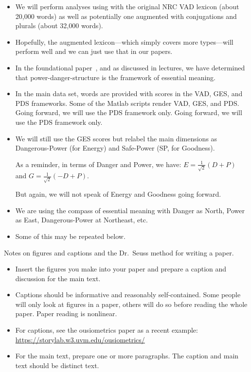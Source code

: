 \begin{itemize}
\item 
  We will perform analyses using with the original NRC VAD lexicon (about 20,000 words)
  as well as potentially one augmented with conjugations and plurals (about 32,000 words).
\item 
  Hopefully, the augmented lexicon---which simply covers more types---will perform well
  and we can just use that in our papers.
\item 
  In the foundational paper~\cite{dodds2021b},
  and as discussed in lectures,
  we have determined that power-danger-structure is the framework of essential meaning.
\item 
  In the main data set, words are provided with scores
  in the VAD, GES, and PDS frameworks. Some of the Matlab scripts
  render VAD, GES, and PDS.
  Going forward, we will use the PDS framework only.
  Going forward, we will use the PDS framework only.
\item
  We will still use the GES scores but relabel the main dimensions as
  Dangerous-Power (for Energy) and Safe-Power (SP, for Goodness).

  As a reminder, in terms of Danger and Power, we have:
  $
  E
  =
  \frac{1}{\sqrt{2}}
  \left(
  D + P
  \right)
  $
  and
  $
  G
  =
  \frac{1}{\sqrt{2}}
  \left(
  - D + P
  \right).
  $

  But again, we will not speak of Energy and Goodness going forward.
\item
  We are using the compass of essential meaning with Danger as North, Power as East,
  Dangerous-Power at Northeast, etc.
\item
  Some of this may be repeated below.
\end{itemize}

Notes on figures and captions and the Dr.\ Seuss method for writing a paper.
\begin{itemize}
\item 
  Insert the figures you make into your paper and prepare a caption
  and discussion for the main text.
\item 
  Captions should be informative and reasonably self-contained.
  Some people will only look at figures in a paper, others will do
  so before reading the whole paper. Paper reading is nonlinear.
\item 
  For captions, see the ousiometrics paper as a recent example:\\
  \url{https://storylab.w3.uvm.edu/ousiometrics/}
\item
  For the main text, prepare one or more paragraphs.
  The caption and main text should be distinct text.
\end{itemize}

